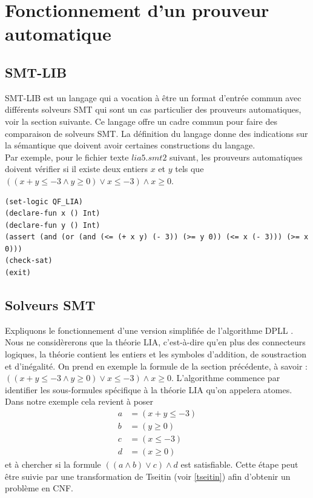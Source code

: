 \documentclass[11pt]{article}
\begin{document}
\newpage
\section{Fonctionnement d'un prouveur automatique}

\subsection{SMT-LIB}\label{smt-lib}

SMT-LIB est un langage qui a vocation à être un format d'entrée commun avec différents solveurs SMT qui sont un cas particulier des prouveurs automatiques, voir la section suivante. Ce langage offre un cadre commun pour faire des comparaison de solveurs SMT. La définition du langage \cite{smtlib} donne des indications sur la sémantique que doivent avoir certaines constructions du langage.\\

Par exemple, pour le fichier texte $lia5.smt2$ suivant, les prouveurs automatiques doivent vérifier si il existe deux entiers $x$ et $y$ tels que $ ((x + y \leq -3 \wedge y \geq 0) \vee x \leq -3) \wedge x \geq 0$.    
\begin{lstlisting}[frame=single]
(set-logic QF_LIA)
(declare-fun x () Int)
(declare-fun y () Int)
(assert (and (or (and (<= (+ x y) (- 3)) (>= y 0)) (<= x (- 3))) (>= x 0)))
(check-sat)
(exit)
\end{lstlisting}

\subsection{Solveurs SMT} \label{smt}

Expliquons le fonctionnement d'une version simplifiée de l'algorithme DPLL \cite{dpll}. Nous ne considèrerons que la théorie LIA, c'est-à-dire qu'en plus des connecteurs logiques, la théorie contient les entiers et les symboles d'addition, de soustraction et d'inégalité. On prend en exemple la formule de la section précédente, à savoir : $((x + y \leq -3 \wedge y \geq 0) \vee x \leq -3) \wedge x \geq 0$. L'algorithme commence par identifier les sous-formules spécifique à la théorie LIA qu'on appelera atomes. Dans notre exemple cela revient à poser
\begin{align*}
  a &= (x + y \leq -3)\\
  b &= (y \geq 0)\\
  c &= (x \leq -3) \\
  d &= (x \geq 0)
\end{align*}
et à chercher si la formule  $((a \wedge b) \vee c) \wedge d$ est satisfiable. Cette étape peut être suivie par une transformation de Tseitin (voir \ref{tseitin}) afin d'obtenir un problème en CNF. \\
\end{document}
